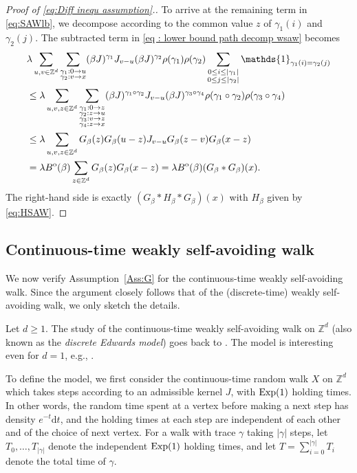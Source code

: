 \documentclass[11pt,a4paper]{article}
\numberwithin{equation}{section}
\theoremstyle{plain}
\theoremstyle{definition}
\newcommand\1{\mathds{1}}
\newcommand{\D}{\mathrm{d}}
\renewcommand{\b}{\beta}
\begin{document}
\begin{proof}[Proof of \eqref{eq:Diff inequ assumption}.]
To arrive at the remaining term in \eqref{eq:SAWlb},
we decompose according to the common value $z$ of $\gamma_1(i)$ and $\gamma_2(j)$. The
subtracted term in \eqref{eq : lower bound path decomp wsaw} becomes
		\begin{align}
			&\lambda \sum_{u,v\in \mathbb{Z}^d}\sum_{\substack{\gamma_1 : 0 \rightarrow u\\\gamma_2 : v \rightarrow x}}(\beta J)^{\gamma_1}J_{v-u}(\beta J)^{\gamma_2}\rho(\gamma_1)\rho(\gamma_2)\sum_{\substack{0\leq i \leq |\gamma_1|\\0\leq j\leq |\gamma_2|}}\mathds{1}_{\gamma_1(i)=\gamma_2(j)}
\nonumber\\
			&\leq  \lambda\sum_{u,v,z \in \mathbb{Z}^d}\sum_{\substack{\gamma_1 : 0 \rightarrow z\\\gamma_2 : z \rightarrow u\\\gamma_3 : v \rightarrow z\\\gamma_4 : z \rightarrow x}}(\beta J)^{\gamma_1  \circ \gamma_2}J_{v-u}(\beta J)^{\gamma_3 \circ\gamma_4}\rho(\gamma_1  \circ \gamma_2)\rho(\gamma_3  \circ\gamma_4)
\nonumber\\
			&\leq  \lambda\sum_{u,v,z \in \mathbb{Z}^d} G_{\b}(z)G_{\b}(u-z)J_{v-u} G_{\b}(z-v)G_{\b}(x-z)
\nonumber\\
						&= \lambda B^{\rm o}(\beta)  \sum_{z \in \mathbb{Z}^d}G_{\b}(z)  G_{\b}(x-z)
    = \lambda B^{\rm o}(\beta) (G_\beta*G_\beta)(x).
\label{eq: proof diff ineq wsaw 1}
		\end{align}
The right-hand side is exactly $(G_\beta*H_\beta*G_\beta)(x)$ with $H_\beta$
given by \eqref{eq:HSAW}.
\end{proof}

\subsection{Continuous-time weakly self-avoiding walk}\label{sec: CTWSAW}

We now verify Assumption~\ref{Ass:G} for the continuous-time weakly
self-avoiding walk. Since the argument closely follows that of the
(discrete-time) weakly self-avoiding walk, we only sketch the details.

Let $d \ge 1$.
The study of the continuous-time weakly self-avoiding walk on $\mathbb Z^d$
(also known as the \emph{discrete Edwards model})
goes back to \cite{BFF84}.  The model is interesting even for $d=1$, e.g., \cite{Liu24}.

To define the model, we first consider the continuous-time random walk $X$ on $\mathbb Z^d$ which takes steps
according to an admissible kernel $J$, with ${\rm Exp}(1)$ holding times.
In other words, the random time spent at a vertex before making a next step
has density $e^{-t} \D t$, and the holding times at each step are independent
of each other and of the choice of next vertex.
For a walk with trace $\gamma$ taking $|\gamma|$
steps, let $T_0,\ldots,T_{|\gamma|}$ denote the independent ${\rm Exp}(1)$ holding
times, and let $T=\sum_{i=0}^{|\gamma|}T_i$ denote the total time of $\gamma$.
\end{document}
